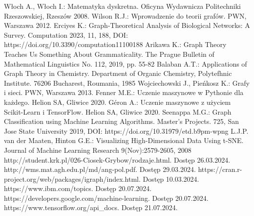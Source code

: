 
\begin{thebibliography}{4}
     Włoch A., Włoch I.: Matematyka dyskretna. Oficyna Wydawnicza Politechniki Rzeszowskiej, Rzeszów 2008.
     Wilson R.J.: Wprowadzenie do teorii grafów. PWN, Warszawa 2012.
     Erciyes K.: Graph-Theoretical Analysis of Biological Networks: A Survey. Computation 2023, 11, 188, DOI: https://doi.org/10.3390/computation11100188
     Arikawa K.: Graph Theory Teaches Us Something About Grammaticality. The Prague Bulletin of Mathematical Linguistics No. 112, 2019, pp. 55-82
     Balaban A.T.: Applications of Graph Theory in Chemistry. Department of Organic Chemistry, Polytefhnic Institute. 76206 Bucharest, Roumania, 1985
     Wojciechowski J., Pieńkosz K.: Grafy i sieci. PWN, Warszawa 2013.
     Fenner M.E.: Uczenie maszynowe w Pythonie dla każdego. Helion SA, Gliwice 2020.
     Géron A.: Uczenie maszynowe z użyciem Scikit-Learn i TensorFlow. Helion SA, Gliwice 2020.
     Seenappa M.G.: Graph Classification using Machine Learning Algorithms. Master's Projects. 725, San Jose State University 2019, DOI: https://doi.org/10.31979/etd.b9pm-wpng
     L.J.P. van der Maaten, Hinton G.E.: Visualizing High-Dimensional Data Using t-SNE. Journal of Machine Learning Research 9(Nov):2579-2605, 2008
     http://student.krk.pl/026-Ciosek-Grybow/rodzaje.html. Dostęp 26.03.2024.
     http://wms.mat.agh.edu.pl/\texttildelow md/ang-pol.pdf. Dostęp 29.03.2024. 
     https://cran.r-project.org/web/packages/igraph/index.html. Dostęp 10.03.2024.
     https://www.ibm.com/topics. Dostęp 20.07.2024.
     https://developers.google.com/machine-learning. Dostęp 20.07.2024.
     https://www.tensorflow.org/api\_docs. Dostęp 21.07.2024.
\end{thebibliography}